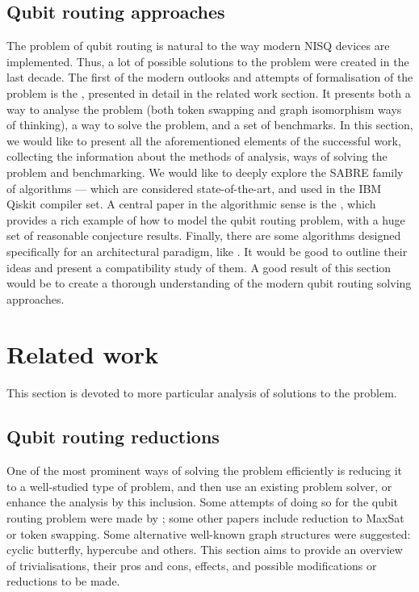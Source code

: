 \subsection{Qubit routing approaches}

The problem of qubit routing is natural to the way modern NISQ devices are implemented. Thus, a lot of possible solutions to the problem were created in the last decade. The first of the modern outlooks and attempts of formalisation of the problem is the \cite{cowtanQubitRoutingProblem2019}, presented in detail in the related work section. It presents both a way to analyse the problem (both token swapping and graph isomorphism ways of thinking), a way to solve the problem, and a set of benchmarks. In this section, we would like to present all the aforementioned elements of the successful work, collecting the information about the methods of analysis, ways of solving the problem and benchmarking. We would like to deeply explore the SABRE family of algorithms \cite{liTacklingQubitMapping2019}--- which are considered state-of-the-art, and used in the IBM Qiskit compiler set. A central paper in the algorithmic sense is the \cite{itoAlgorithmicTheoryQubit2023}, which provides a rich example of how to model the qubit routing problem, with a huge set of reasonable conjecture results. Finally, there are some algorithms designed specifically for an architectural paradigm, like \cite{willeMQTQMAPEfficient2023}. It would be good to outline their ideas and present a compatibility study of them. A good result of this section would be to create a thorough understanding of the modern qubit routing solving approaches.


\section{Related work}

This section is devoted to more particular analysis of solutions to the problem.

\subsection{Qubit routing reductions}
One of the most prominent ways of solving the problem efficiently is reducing it to a well-studied type of problem, and then use an existing problem solver, or enhance the analysis by this inclusion. Some attempts of doing so for the qubit routing problem were made by \cite{brierleyEfficientImplementationQuantum2016}; some other papers include reduction to MaxSat or token swapping. Some alternative well-known graph structures were suggested: cyclic butterfly, hypercube and others. This section aims to provide an overview of trivialisations, their pros and cons, effects, and possible modifications or reductions to be made.  

